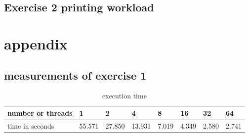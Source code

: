 \documentclass[11pt,a4paper]{article}
\begin{document}
\subsection{Exercise 2 printing workload}
\label{ex22}

\pagebreak

\section{appendix}

\subsection{measurements of exercise 1}
\begin{table}[h]
\centering

\label{measuresEx1}
\begin{tabular}{@{}l||l|l|l|l|l|l|l|@{}}
number or threads & 1      & 2      & 4      & 8     & 16    & 32    & 64    \\
\hline	
time in seconds   & 55.571 & 27.850 & 13.931 & 7.019 & 4.349 & 2.580 & 2.741
\end{tabular}
\caption{execution time}
\end{table}

\listoffigures

\listoftables






\end{document}
